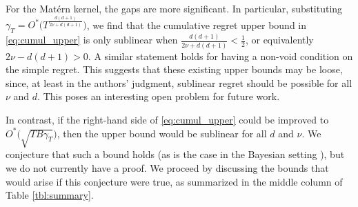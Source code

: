 \documentclass[english,onecolumn,final,11pt]{IEEEtran} %
\begin{document}
For the Mat\'ern kernel, the gaps are more significant.  In particular, substituting $\gamma_T = O^*\big( T^{\frac{d(d+1)}{2\nu + d(d+1)}}\big)$, we find that the cumulative regret upper bound in \eqref{eq:cumul_upper} is only sublinear when $\frac{d(d+1)}{2\nu + d(d+1)} < \frac{1}{2}$, or equivalently $2\nu-d(d+1)>0$.  A similar statement holds for having a non-void condition on the simple regret.  This suggests that these existing upper bounds may be loose, since, at least in the authors' judgment,  sublinear regret should be possible for all $\nu$ and $d$.  This poses an interesting open problem for future work.

In contrast, if the right-hand side of \eqref{eq:cumul_upper} could be improved to $O^*\big( \sqrt{TB\gamma_T} \big)$, then the upper bound would be sublinear for all $d$ and $\nu$.  We conjecture that such a bound holds (as is the case in the Bayesian setting \cite{Sri09}), but we do not currently have a proof.  We proceed by discussing the bounds that would arise if this conjecture were true, as summarized in the middle column of Table \ref{tbl:summary}.
\end{document}

